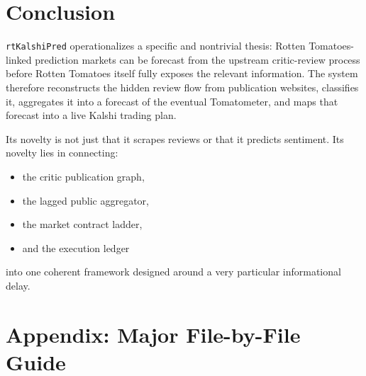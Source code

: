 \documentclass[11pt]{article}
\begin{document}
\section{Conclusion}
\texttt{rtKalshiPred} operationalizes a specific and nontrivial thesis: Rotten Tomatoes-linked prediction markets can be forecast from the upstream critic-review process before Rotten Tomatoes itself fully exposes the relevant information. The system therefore reconstructs the hidden review flow from publication websites, classifies it, aggregates it into a forecast of the eventual Tomatometer, and maps that forecast into a live Kalshi trading plan.

Its novelty is not just that it scrapes reviews or that it predicts sentiment. Its novelty lies in connecting:
\begin{itemize}[leftmargin=1.5em]
    \item the critic publication graph,
    \item the lagged public aggregator,
    \item the market contract ladder,
    \item and the execution ledger
\end{itemize}
into one coherent framework designed around a very particular informational delay.

\appendix
\section{Appendix: Major File-by-File Guide}
\end{document}
